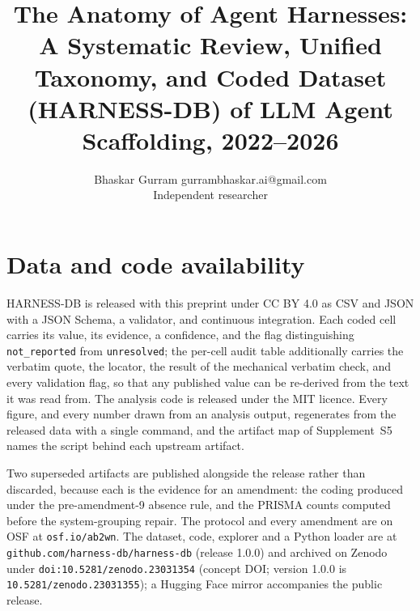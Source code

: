 \documentclass{article}
\title{The Anatomy of Agent Harnesses: A Systematic Review, Unified Taxonomy, and Coded Dataset (HARNESS-DB) of LLM Agent Scaffolding, 2022--2026}
\author{\name Bhaskar Gurram \email gurrambhaskar.ai@gmail.com \\ \addr Independent researcher}
\begin{document}
\maketitle
\begin{abstract}

\end{abstract}












\section*{Data and code availability}

HARNESS-DB is released with this preprint under CC BY 4.0 as CSV and JSON with a JSON Schema, a validator, and continuous
integration. Each coded cell carries its value, its evidence, a confidence, and the flag distinguishing
\texttt{not\_reported} from \texttt{unresolved}; the per-cell audit table additionally carries the
verbatim quote, the locator, the result of the mechanical verbatim check, and every validation flag, so
that any published value can be re-derived from the text it was read from. The analysis code is released
under the MIT licence. Every figure, and every number drawn from an analysis output, regenerates from the
released data with a single command, and the artifact map of Supplement~S5 names the script behind each
upstream artifact.

Two superseded artifacts are published alongside the release rather than discarded, because each is the
evidence for an amendment: the coding produced under the pre-amendment-9 absence rule, and the PRISMA
counts computed before the system-grouping repair. The protocol and every amendment are on OSF at
\texttt{osf.io/ab2wn}. The dataset, code, explorer and a Python loader are at
\texttt{github.com/harness-db/harness-db} (release 1.0.0) and archived on Zenodo under
\texttt{doi:10.5281/zenodo.23031354} (concept DOI; version 1.0.0 is \texttt{10.5281/zenodo.23031355});
a Hugging Face mirror accompanies the public release.
\end{document}
